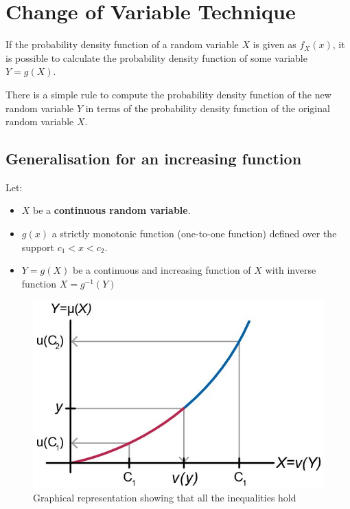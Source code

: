 \documentclass[10pt,a4paper]{article}
\begin{document}
\section{Change of Variable Technique}

If the probability density function of a random variable $X$ is given as $f_X(x)$, it is
possible to calculate the probability density function of some variable $Y = g(X)$.

There is a simple rule to compute the probability density function of the new random variable $Y$ in terms of
the probability density function of the original random variable $X$.

\subsection{Generalisation for an increasing function}

Let:
\begin{itemize}
    \item $X$ be a \textbf{continuous random variable}.
    \item $g(x)$ a strictly monotonic function (one-to-one function) defined over the support $c_1 < x < c_2$.
    \item $Y = g(X)$ be a continuous and increasing function of $X$ with inverse function $X=g^{-1}(Y)$ 
\end{itemize} 

\begin{figure} [h!]
    \centering
    \includegraphics[scale=0.5]{CoVin.JPG}
    \caption{Graphical representation showing that all the inequalities hold}
\end{figure}
\end{document}
